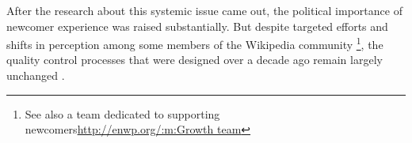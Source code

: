 After the research about this systemic issue came out, the political importance of newcomer experience was raised substantially.  But despite targeted efforts and shifts in perception among some members of the Wikipedia community \cite{narayan2015effects, morgan2013tea}\footnote{See also a team dedicated to supporting newcomers\url{http://enwp.org/:m:Growth team}}, the quality control processes that were designed over a decade ago remain largely unchanged \cite{halfaker2014snuggle}.
